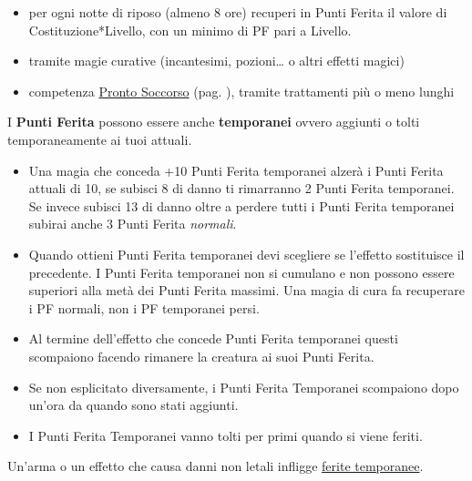 \begin{itemize}[leftmargin=*] \setlength{\itemsep}{0pt}

\item per ogni notte di riposo (almeno 8 ore) recuperi in Punti Ferita il valore di Costituzione*Livello, con un minimo di PF pari a Livello. 

\item tramite magie curative (incantesimi, pozioni… o altri effetti magici)

\item competenza \hyperlink{prontosoccorso}{Pronto Soccorso} (pag. \pageref{prontosoccorso}), tramite trattamenti più o meno lunghi

\end{itemize}

I \textbf{Punti Ferita} possono essere anche \textbf{temporanei} ovvero aggiunti o tolti temporaneamente ai tuoi attuali.

\noindent\begin{itemize}[leftmargin=*] \setlength{\itemsep}{0pt}

\item Una magia che conceda +10 Punti Ferita temporanei alzerà i Punti Ferita attuali di 10, se subisci 8 di danno ti rimarranno 2 Punti Ferita temporanei. Se invece subisci 13 di danno oltre a perdere tutti i Punti Ferita temporanei subirai anche 3 Punti Ferita \emph{normali}.

\item Quando ottieni Punti Ferita temporanei devi scegliere se l'effetto sostituisce il precedente. I Punti Ferita temporanei non si cumulano e non possono essere superiori alla metà dei Punti Ferita massimi. Una magia di cura fa recuperare i PF normali, non i PF temporanei persi.

\item Al termine dell'effetto che concede Punti Ferita temporanei questi scompaiono facendo rimanere la creatura ai suoi Punti Ferita.

\item Se non esplicitato diversamente, i Punti Ferita Temporanei scompaiono dopo un'ora da quando sono stati aggiunti.

\item I Punti Ferita Temporanei vanno tolti per primi quando si viene feriti.

\end{itemize}

Un'arma o un effetto che causa danni non letali infligge \hyperlink{recuperopuntiferitanonletali}{ferite temporanee}\label{feritetemporanee}.

